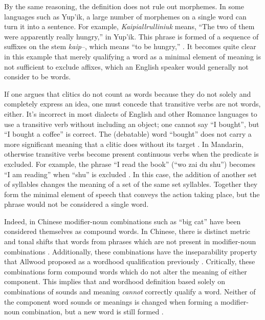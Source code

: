 \documentclass{article}
\begin{document}
By the same reasoning, the definition does not rule out morphemes. In some languages such as Yup'ik, a large number of morphemes on a single word can turn it into a sentence. For example, \textit{Kaipiallrulliniuk} means, ``The two of them were apparently really hungry,'' in Yup'ik. This phrase is formed of a sequence of suffixes on the stem \textit{kaip--}, which means ``to be hungry,'' \cite{allwood}. It becomes quite clear in this example that merely qualifying a word as a minimal element of meaning is not sufficient to exclude affixes, which an English speaker would generally not consider to be words.

If one argues that clitics do not count as words because they do not solely and completely express an idea, one must concede that transitive verbs are not words, either. It's incorrect in most dialects of English and other Romance languages to use a transitive verb without including an object; one cannot say ``I bought'', but ``I bought a coffee'' is correct. The (debatable) word ``bought'' does not carry a more significant meaning that a clitic does without its target \cite{trask}. In Mandarin, otherwise transitive verbs become present continuous verbs when the predicate is excluded. For example, the phrase ``I read the book'' (``wo zai du shu'') becomes ``I am reading'' when ``shu'' is excluded \cite{tieu2007transitivity}. In this case, the addition of another set of syllables changes the meaning of a set of the same set syllables. Together they form the minimal element of speech that conveys the action taking place, but the phrase would not be considered a single word.

Indeed, in Chinese modifier-noun combinations such as ``big cat'' have been considered themselves as compound words. In Chinese, there is distinct metric and tonal shifts that words from phrases which are not present in modifier-noun combinations \cite{duanmu1997recursive}. Additionally, these combinations have the inseparability property that Allwood proposed as a wordhood qualification previously \cite{allwood}. Critically, these combinations form compound words which do not alter the meaning of either component. This implies that and wordhood definition based solely on combinations of sounds and meaning \textit{cannot} correctly qualify a word. Neither of the component word sounds or meanings is changed when forming a modifier-noun combination, but a new word is still formed \cite{duanmu1997recursive}.

\bigskip
\end{document}
